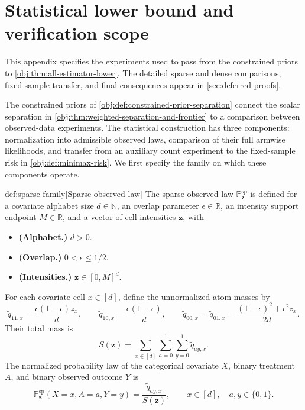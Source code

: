 \section{Statistical lower bound and verification scope}\label{sec:appendix-lower-bound}

This appendix specifies the experiments used to pass from the constrained priors to \cref{obj:thm:all-estimator-lower}. The detailed sparse and dense comparisons, fixed-sample transfer, and final consequences appear in \cref{sec:deferred-proofs}.

The constrained priors of \cref{obj:def:constrained-prior-separation} connect the scalar separation in \cref{obj:thm:weighted-separation-and-frontier} to a comparison between observed-data experiments. The statistical construction has three components: normalization into admissible observed laws, comparison of their full armwise likelihoods, and transfer from an auxiliary count experiment to the fixed-sample risk in \cref{obj:def:minimax-risk}. We first specify the family on which these components operate.

\begin{definitionv}{def:sparse-family}[Sparse observed law]
The sparse observed law \(\mathbb P_{\mathbf z}^{\mathrm{sp}}\) is defined for a covariate alphabet size \(d\in\mathbb N\), an overlap parameter \(\epsilon\in\mathbb R\), an intensity support endpoint \(M\in\mathbb R\), and a vector of cell intensities \(\mathbf z\), with
\begin{itemize}
\item \textbf{(Alphabet.)} \(d>0\).
\item \textbf{(Overlap.)} \(0<\epsilon\le 1/2\).
\item \textbf{(Intensities.)} \(\mathbf z\in[0,M]^d\).
\end{itemize}
For each covariate cell \(x\in[d]\), define the unnormalized atom masses by
\[
\widetilde q_{11,x}=\frac{\epsilon(1-\epsilon)z_x}{d},
\qquad
\widetilde q_{10,x}=\frac{\epsilon(1-\epsilon)}{d},
\qquad
\widetilde q_{00,x}=\widetilde q_{01,x}
=\frac{(1-\epsilon)^2+\epsilon^2z_x}{2d}.
\]
Their total mass is
\[
S(\mathbf z)
=\sum_{x\in[d]}\sum_{a=0}^1\sum_{y=0}^1\widetilde q_{ay,x}.
\]
The normalized probability law of the categorical covariate \(X\), binary treatment \(A\), and binary observed outcome \(Y\) is
\[
\mathbb P_{\mathbf z}^{\mathrm{sp}}(X=x,A=a,Y=y)
=\frac{\widetilde q_{ay,x}}{S(\mathbf z)},
\qquad x\in[d],\quad a,y\in\{0,1\}.
\]
\end{definitionv}

